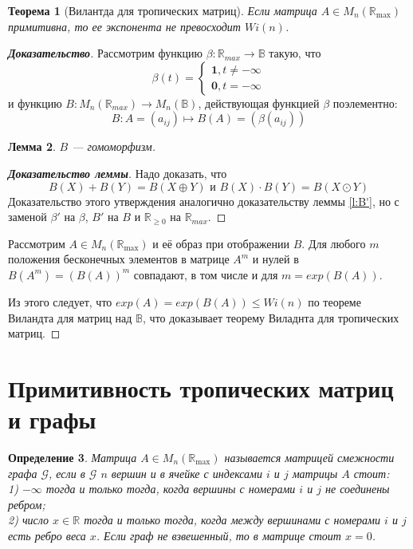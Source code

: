\documentclass[12pt]{article}
\newtheorem{theorem}{Теорема}[section]
\newtheorem{definition}[theorem]{Определение}
\newtheorem{lemma}[theorem]{Лемма}
\begin{document}
\begin{theorem}[Вилантда для тропических матриц]
\label{tropicalWielandtTh}
Если матрица $A\in M_n(\mathbb{R}_{\max}) $ примитивна, то ее экспонента не превосходит $Wi(n)$.
\end{theorem}
\begin{proof} [\textbf{Доказательство}]
Рассмотрим функцию $\beta : \mathbb{R}_{max} \rightarrow \mathbb{B}$ такую, что
\begin{equation}
    \beta(t) = 
    \begin{cases}
        \textbf{1}, t \neq -\infty \\
        \textbf{0}, t = -\infty
    \end{cases}
\end{equation}
и функцию $B : M_n(\mathbb{R}_{max}) \rightarrow M_n(\mathbb{B})$, действующая функцией $\beta$ поэлементно:
\begin{equation}
     B : A=(a_{ij}) \mapsto B(A)=(\beta(a_{ij}))
\end{equation}
\begin{lemma}
$B$ --- гомоморфизм.
\end{lemma}
\begin{proof} [\textbf{Доказательство леммы}]
Надо доказать, что
\begin{equation}
    B(X)+B(Y)=B(X\oplus Y) \text{ и } B(X) \cdot B(Y) = B(X\odot Y)
\end{equation}
Доказательство этого утверждения аналогично доказательству леммы \ref{l:B'}, но с заменой $\beta'$ на $\beta$, $B'$ на $B$ и $\mathbb{R}_{\geq0}$ на $\mathbb{R}_{max}$.
\end{proof}

Рассмотрим $A \in M_n(\mathbb{R}_{\max})$ и её образ при отображении $B$. Для любого $m$ положения бесконечных элементов в матрице $A^m$ и нулей в $B(A^m) = (B(A))^m$ совпадают, в том числе и для $m = exp(B(A))$.

Из этого следует, что $exp(A) = exp(B(A)) \le Wi(n)$ по теореме Виландта для матриц над $\mathbb{B}$, что доказывает теорему Виладнта для тропических матриц.
\end{proof}

\section{Примитивность тропических матриц и графы}
\begin{definition}
Матрица $A \in M_n(\mathbb{R}_{\max})$ называется матрицей смежности графа $\mathcal{G}$, если в $\mathcal{G}$ $n$ вершин и в ячейке с индексами $i$ и $j$ матрицы $A$ стоит: \\
1) $-\infty$ тогда и только тогда, когда вершины с номерами $i$ и $j$ не соединены ребром; \\
2) число $x \in \mathbb{R}$ тогда и только тогда, когда между вершинами с номерами $i$ и $j$ есть ребро веса $x$. Если граф не взвешенный, то в матрице стоит $x = 0$.
\end{definition}
\end{document}
